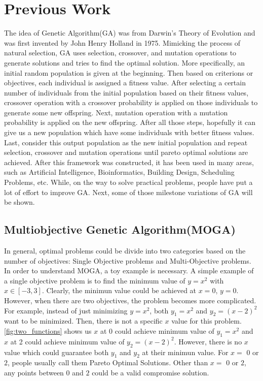 \section{Previous Work}

The idea of Genetic Algorithm(GA) was from Darwin's Theory of Evolution and was first invented by John Henry Holland in 1975\cite{Holland_1975_Book}. Mimicking the process of natural selection, GA uses selection, crossover, and mutation operations to generate solutions and tries to find the optimal solution. More specifically, an initial random population is given at the beginning. Then based on criterions or objectives, each individual is assigned a fitness value. After selecting a certain number of individuals from the initial population based on their fitness values, crossover operation with a crossover probability is applied on those individuals to generate some new offspring. Next, mutation operation with a mutation probability is applied on the new offspring. After all those steps, hopefully it can give us a new population which have some individuals with better fitness values. Last, consider this output population as the new initial population and repeat selection, crossover and mutation operations until pareto optimal solutions are achieved. After this framework was constructed, it has been used in many areas, such as Artificial Intelligence, Bioinformatics, Building Design, Scheduling Problems, etc. While, on the way to solve practical problems, people have put a lot of effort to improve GA. Next, some of those milestone variations of GA will be shown.

\subsection{Multiobjective Genetic Algorithm(MOGA)}
In general, optimal problems could be divide into two categories based on the number of objectives: Single Objective problems and Multi-Objective problems. In order to understand MOGA, a toy example is necessary. A simple example of a single objective problem is to find the minimum value of \(y=x^2\) with \(x\in [-3,3]\). Clearly, the minimun value could be achieved at \(x=0\), \(y=0\). However, when there are two objectives, the problem becomes more complicated. For example, instead of just minimizing \(y=x^2\), both \(y_{1}=x^2\) and \(y_{2}=(x-2)^2\) want to be minimized. Then, there is not a specific \(x\) value for this problem. \autoref{fig:two_functions} shows us \(x\) at 0 could achieve minimum value of \(y_{1}=x^2\) and \(x\) at 2 could achieve minimum value of \(y_{2}=(x-2)^2\). However, there is no \(x\) value which could guarantee both \(y_{1}\) and \(y_{2}\) at their minimun value. For \(x=\) \(0\) or \(2\), people usually call them Pareto Optimal Solutions\cite{Hans_1988_Multicriteria_Pareto_Optimal}\cite{Vira_1983_Multiobjective_Pareto_Optimal}. Other than \(x=\) \(0\) or \(2\), any points between \(0\) and \(2\) could be a valid compromise solution. 


